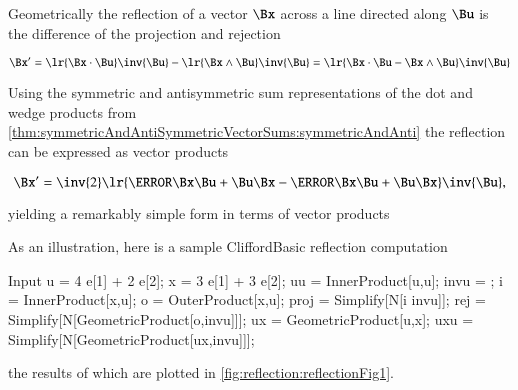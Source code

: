 %
%

Geometrically the reflection of a vector \( \Bx \) across a line directed along \( \Bu \) is the difference of the projection and rejection

\begin{dmath}\label{eqn:reflection:900}
\Bx'
= \lr{ \Bx \cdot \Bu } \inv{\Bu} - \lr{ \Bx \wedge \Bu } \inv{\Bu }
= \lr{ \Bx \cdot \Bu - \Bx \wedge \Bu } \inv{\Bu }
\end{dmath}

Using the symmetric and antisymmetric sum representations of the dot and wedge products from
\cref{thm:symmetricAndAntiSymmetricVectorSums:symmetricAndAnti}
the reflection can be expressed as vector products

\begin{dmath}\label{eqn:reflection:940}
\Bx'
= \inv{2} \lr{ \cancel{\Bx \Bu} + \Bu \Bx - \cancel{\Bx \Bu} + \Bu \Bx } \inv{\Bu },
\end{dmath}

yielding a remarkably simple form in terms of vector products


As an illustration, here is a sample CliffordBasic reflection computation

\begin{mmaCell}[moredefined={u, e, x, uu, InnerProduct, invu, i, o, OuterProduct, proj, rej, GeometricProduct, ux, uxu}]{Input}
u = 4 e[1] + 2 e[2]; x = 3 e[1] + 3 e[2];
uu = InnerProduct[u,u]; invu = ;
i = InnerProduct[x,u]; o = OuterProduct[x,u];
proj = Simplify[N[i invu]];
rej = Simplify[N[GeometricProduct[o,invu]]];
ux = GeometricProduct[u,x];
uxu = Simplify[N[GeometricProduct[ux,invu]]];
\end{mmaCell}

the results of which are plotted in \cref{fig:reflection:reflectionFig1}.

